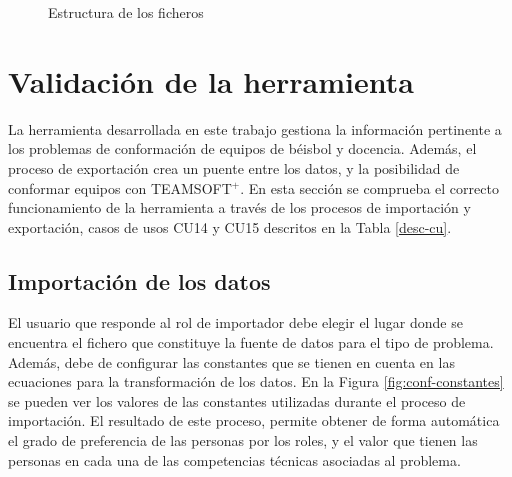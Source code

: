 \begin{figure}[H]
	\centering
	
	\caption{Estructura de los ficheros}\label{fig:ejemplo-estruct-fichero}
\end{figure}

\section{Validación de la herramienta}

La herramienta desarrollada en este trabajo gestiona la información pertinente a los problemas de conformación de equipos de béisbol y docencia. Además, el proceso de exportación crea un puente entre los datos, y la posibilidad de conformar equipos con TEAMSOFT$^+$. En esta sección se comprueba el correcto funcionamiento de la herramienta a través de los procesos de importación y exportación, casos de usos CU14 y CU15 descritos en la Tabla \ref{desc-cu}.

\subsection{Importación de los datos}

El usuario que responde al rol de importador debe elegir el lugar donde se encuentra el fichero que constituye la fuente de datos para el tipo de problema. Además, debe de configurar las constantes que se tienen en cuenta en las ecuaciones para la transformación de los datos. En la Figura \ref{fig:conf-constantes} se pueden ver los valores de las constantes utilizadas durante el proceso de importación. El resultado de este proceso, permite obtener de forma automática el grado de preferencia de las personas por los roles, y el valor que tienen las personas en cada una de las competencias técnicas asociadas al problema. \\

